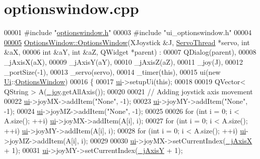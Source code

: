 \hypertarget{a00017_source}{}\section{optionswindow.\+cpp}

\begin{DoxyCode}
00001 \textcolor{preprocessor}{#include "\hyperlink{a00018}{optionswindow.h}"}
00003 \textcolor{preprocessor}{#include "ui\_optionswindow.h"}
00004 
\hypertarget{a00017_source_l00005}{}\hyperlink{a00005_a968da93eec85561ebdb3a464eff15611}{00005} \hyperlink{a00005_a968da93eec85561ebdb3a464eff15611}{OptionsWindow::OptionsWindow}(XJoystick &J, 
      \hyperlink{a00007}{ServoThread} *servo, \textcolor{keywordtype}{int} &aX, 
00006                              \textcolor{keywordtype}{int} &aY, \textcolor{keywordtype}{int} &aZ, QWidget *parent) :
00007     QDialog(parent),
00008     \_jAxisX(aX),
00009     \_jAxisY(aY),
00010     \_jAxisZ(aZ),
00011     \_joy(J),
00012     \_portSize(-1),
00013     \_servo(servo),
00014     \_timer(this),
00015     ui(new \hyperlink{a00023}{Ui}::\hyperlink{a00005}{OptionsWindow})
00016 \{
00017     \hyperlink{a00005_a8347442d5b3b670e8fff0c4102db1f88}{ui}->setupUi(\textcolor{keyword}{this});
00018     
00019     QVector< QString > A(\hyperlink{a00005_a1bf846ab681ab245f70adac30999947c}{\_joy}.getAllAxis());
00020     
00021     \textcolor{comment}{// Adding joystick axis movement}
00022     \hyperlink{a00005_a8347442d5b3b670e8fff0c4102db1f88}{ui}->joyMX->addItem(\textcolor{stringliteral}{"None"}, -1);
00023     \hyperlink{a00005_a8347442d5b3b670e8fff0c4102db1f88}{ui}->joyMY->addItem(\textcolor{stringliteral}{"None"}, -1);
00024     \hyperlink{a00005_a8347442d5b3b670e8fff0c4102db1f88}{ui}->joyMZ->addItem(\textcolor{stringliteral}{"None"}, -1);
00025     
00026     \textcolor{keywordflow}{for} (\textcolor{keywordtype}{int} i = 0; i < A.size(); ++i) \hyperlink{a00005_a8347442d5b3b670e8fff0c4102db1f88}{ui}->joyMX->addItem(A[i], i);
00027     \textcolor{keywordflow}{for} (\textcolor{keywordtype}{int} i = 0; i < A.size(); ++i) \hyperlink{a00005_a8347442d5b3b670e8fff0c4102db1f88}{ui}->joyMY->addItem(A[i], i);
00028     \textcolor{keywordflow}{for} (\textcolor{keywordtype}{int} i = 0; i < A.size(); ++i) \hyperlink{a00005_a8347442d5b3b670e8fff0c4102db1f88}{ui}->joyMZ->addItem(A[i], i);
00029     
00030     \hyperlink{a00005_a8347442d5b3b670e8fff0c4102db1f88}{ui}->joyMX->setCurrentIndex(\hyperlink{a00005_a01d6284355011203ee6e8856a0bdf557}{\_jAxisX} + 1);
00031     \hyperlink{a00005_a8347442d5b3b670e8fff0c4102db1f88}{ui}->joyMY->setCurrentIndex(\hyperlink{a00005_a8921d1cc5bcb527466c28feb5dcc59b1}{\_jAxisY} + 1);

\end{DoxyCode}
